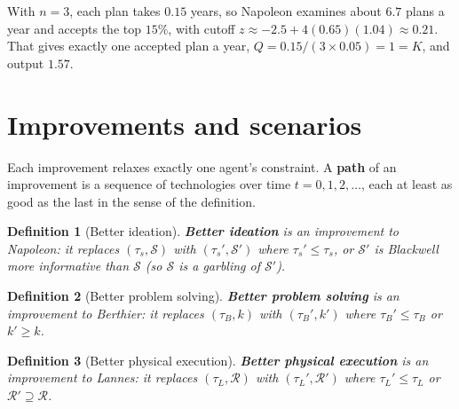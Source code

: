 \documentclass[11pt]{article}
\newcommand{\Nap}{\textcolor{nap}{Napoleon}}
\newcommand{\Ber}{\textcolor{ber}{Berthier}}
\newcommand{\Lan}{\textcolor{lan}{Lannes}}
\newtheorem{definition}{Definition}
\theoremstyle{remark}
\newcommand{\Rcal}{\mathcal{R}}
\newcommand{\Scal}{\mathcal{S}}
\begin{document}
With $n=3$, each plan takes $0.15$ years, so \Nap{} examines about $6.7$ plans a year and accepts the top $15\%$, with cutoff $z\approx-2.5+4(0.65)(1.04)\approx0.21$. That gives exactly one accepted plan a year, $Q=0.15/(3\times0.05)=1=K$, and output $1.57$.

\section{Improvements and scenarios}\label{sec:improvements}

Each improvement relaxes exactly one agent's constraint. A \textbf{path} of an improvement is a sequence of technologies over time $t=0,1,2,\dots$, each at least as good as the last in the sense of the definition.

\setcounter{definition}{3}\begin{definition}[Better ideation]\label{def:ideation}
\textbf{Better ideation} is an improvement to \Nap: it replaces $(\tau_s,\Scal)$ with $(\tau_s',\Scal')$ where $\tau_s'\le\tau_s$, or $\Scal'$ is Blackwell more informative than $\Scal$ (so $\Scal$ is a garbling of $\Scal'$).
\end{definition}

\begin{definition}[Better problem solving]\label{def:solving}
\textbf{Better problem solving} is an improvement to \Ber: it replaces $(\tau_B,k)$ with $(\tau_B',k')$ where $\tau_B'\le\tau_B$ or $k'\ge k$.
\end{definition}

\begin{definition}[Better physical execution]\label{def:execution}
\textbf{Better physical execution} is an improvement to \Lan: it replaces $(\tau_L,\Rcal)$ with $(\tau_L',\Rcal')$ where $\tau_L'\le\tau_L$ or $\Rcal'\supseteq\Rcal$.
\end{definition}
\end{document}
